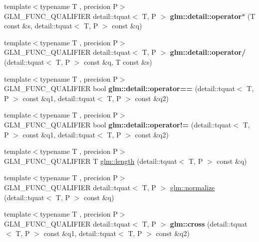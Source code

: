 \begin{DoxyCompactItemize}
\item 
{\footnotesize template$<$typename T , precision P$>$ }\\G\+L\+M\+\_\+\+F\+U\+N\+C\+\_\+\+Q\+U\+A\+L\+I\+F\+I\+ER detail\+::tquat$<$ T, P $>$ {\bfseries glm\+::detail\+::operator$\ast$} (T const \&s, detail\+::tquat$<$ T, P $>$ const \&q)\hypertarget{glm_2include_2glm_2gtc_2quaternion_8inl_a935c219439467864d00ca30e5620a4e1}{}\label{glm_2include_2glm_2gtc_2quaternion_8inl_a935c219439467864d00ca30e5620a4e1}

\item 
{\footnotesize template$<$typename T , precision P$>$ }\\G\+L\+M\+\_\+\+F\+U\+N\+C\+\_\+\+Q\+U\+A\+L\+I\+F\+I\+ER detail\+::tquat$<$ T, P $>$ {\bfseries glm\+::detail\+::operator/} (detail\+::tquat$<$ T, P $>$ const \&q, T const \&s)\hypertarget{glm_2include_2glm_2gtc_2quaternion_8inl_ac97f2ce870d9bf40b6108d05f8371242}{}\label{glm_2include_2glm_2gtc_2quaternion_8inl_ac97f2ce870d9bf40b6108d05f8371242}

\item 
{\footnotesize template$<$typename T , precision P$>$ }\\G\+L\+M\+\_\+\+F\+U\+N\+C\+\_\+\+Q\+U\+A\+L\+I\+F\+I\+ER bool {\bfseries glm\+::detail\+::operator==} (detail\+::tquat$<$ T, P $>$ const \&q1, detail\+::tquat$<$ T, P $>$ const \&q2)\hypertarget{glm_2include_2glm_2gtc_2quaternion_8inl_aaa2da89669d53c8809c654fcba9ac875}{}\label{glm_2include_2glm_2gtc_2quaternion_8inl_aaa2da89669d53c8809c654fcba9ac875}

\item 
{\footnotesize template$<$typename T , precision P$>$ }\\G\+L\+M\+\_\+\+F\+U\+N\+C\+\_\+\+Q\+U\+A\+L\+I\+F\+I\+ER bool {\bfseries glm\+::detail\+::operator!=} (detail\+::tquat$<$ T, P $>$ const \&q1, detail\+::tquat$<$ T, P $>$ const \&q2)\hypertarget{glm_2include_2glm_2gtc_2quaternion_8inl_a7a8bcff114f9833b09ab0da9af5232f1}{}\label{glm_2include_2glm_2gtc_2quaternion_8inl_a7a8bcff114f9833b09ab0da9af5232f1}

\item 
{\footnotesize template$<$typename T , precision P$>$ }\\G\+L\+M\+\_\+\+F\+U\+N\+C\+\_\+\+Q\+U\+A\+L\+I\+F\+I\+ER T \hyperlink{group__gtc__quaternion_ga3406ab83e2cafd4034f359957e942410}{glm\+::length} (detail\+::tquat$<$ T, P $>$ const \&q)
\item 
{\footnotesize template$<$typename T , precision P$>$ }\\G\+L\+M\+\_\+\+F\+U\+N\+C\+\_\+\+Q\+U\+A\+L\+I\+F\+I\+ER detail\+::tquat$<$ T, P $>$ \hyperlink{group__gtc__quaternion_ga34ee289ca53a08207904e935104715d8}{glm\+::normalize} (detail\+::tquat$<$ T, P $>$ const \&q)
\item 
{\footnotesize template$<$typename T , precision P$>$ }\\G\+L\+M\+\_\+\+F\+U\+N\+C\+\_\+\+Q\+U\+A\+L\+I\+F\+I\+ER detail\+::tquat$<$ T, P $>$ {\bfseries glm\+::cross} (detail\+::tquat$<$ T, P $>$ const \&q1, detail\+::tquat$<$ T, P $>$ const \&q2)\hypertarget{namespaceglm_ad70062c675bba04acb6b067c448f6b9e}{}\label{namespaceglm_ad70062c675bba04acb6b067c448f6b9e}


\end{DoxyCompactItemize}
